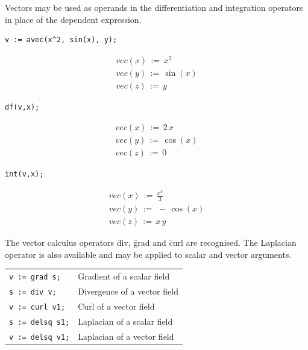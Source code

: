  
 
Vectors may be used as operands in the differentiation and integration
operators in place of the dependent expression.

\begin{verbatim}
v := avec(x^2, sin(x), y);
\end{verbatim}
\begin{gather*}
vec(x)\,:=\,x^2\\
vec(y)\,:=\,\sin(x)\\
vec(z)\,:=\,y
\end{gather*}
\begin{verbatim}
df(v,x);
\end{verbatim}
\begin{gather*}
vec(x)\,:=\,2\,x\\
vec(y)\,:=\,\cos(x)\\
vec(z)\,:=\,0
\end{gather*}
\begin{verbatim}
int(v,x);
\end{verbatim}
\begin{gather*}
vec(x)\,:=\,\frac{x^3}{3}\\
vec(y)\,:=\,\,-\,\cos(x)\\
vec(z)\,:=\,x\,y
\end{gather*}

 
 
 
 
\hypertarget{operator:DIV}{}
\hypertarget{operator:GRAD}{}
\hypertarget{operator:CURL}{}
\hypertarget{operator:DELSQ}{}
The vector calculus operators \f{div}, \f{grad} and \f{curl} are recognised.
The Laplacian operator is also available and may be applied to
scalar and vector arguments.

\begin{tabular}{l|l}
\texttt{v := grad s;} & Gradient of a scalar field \\
\texttt{s := div v;} & Divergence of a vector field \\
\texttt{v := curl v1;} & Curl of a vector field \\
\texttt{s := delsq s1;} & Laplacian of a scalar field \\
\texttt{v := delsq v1;} & Laplacian of a vector field
\end{tabular}

